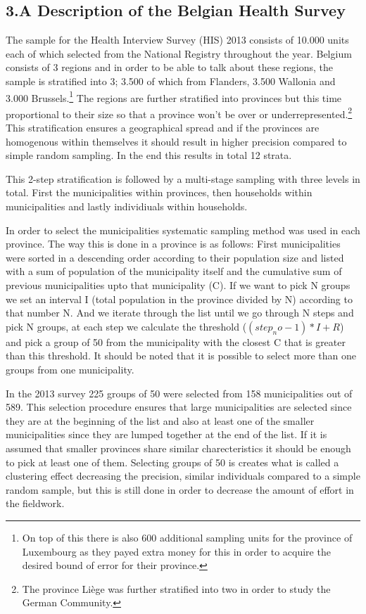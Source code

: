 \subsection*{3.A Description of the Belgian Health Survey}

The sample for the Health Interview Survey (HIS) 2013 consists of 10.000 units each of which selected from the National Registry throughout the year. Belgium consists of 3 regions and in order to be able to talk about these regions, the sample is stratified into 3; 3.500 of which from Flanders, 3.500 Wallonia and 3.000 Brussels.\footnote{On top of this there is also 600 additional sampling units for the province of Luxembourg as they payed extra money for this in order to acquire the desired bound of error for their province.} The regions are further stratified into provinces but this time proportional to their size so that a province won't be over or underrepresented.\footnote{The province Liège was further stratified into two in order to study the German Community.} This stratification ensures a geographical spread and if the provinces are homogenous within themselves it should result in higher precision compared to simple random sampling. In the end this results in total 12 strata.

This 2-step stratification is followed by a multi-stage sampling with three levels in total. First the municipalities within provinces, then households within municipalities and lastly individiuals within households. 

In order to select the municipalities systematic sampling method was used in each province. The way this is done in a province is as follows: First municipalities were sorted in a descending order according to their population size and listed with a sum of population of the municipality itself and the cumulative sum of previous municipalities upto that municipality (C). If we want to pick N groups we set an interval I (total population in the province divided by N) according to that number N. And we iterate through the list until we go through N steps and pick N groups, at each step we calculate the threshold ($(step_no-1)*I + R$) and pick a group of 50 from the municipality with the closest C that is greater than this threshold. It should be noted that it is possible to select more than one groups from one municipality.

In the 2013 survey 225 groups of 50 were selected from 158 municipalities out of 589. This selection procedure ensures that large municipalities are selected since they are at the beginning of the list and also at least one of the smaller municipalities since they are lumped together at the end of the list. If it is assumed that smaller provinces share similar charecteristics it should be enough to pick at least one of them. Selecting groups of 50 is creates what is called a clustering effect decreasing the precision, similar individuals compared to a simple random sample, but this is still done in order to decrease the amount of effort in the fieldwork.

